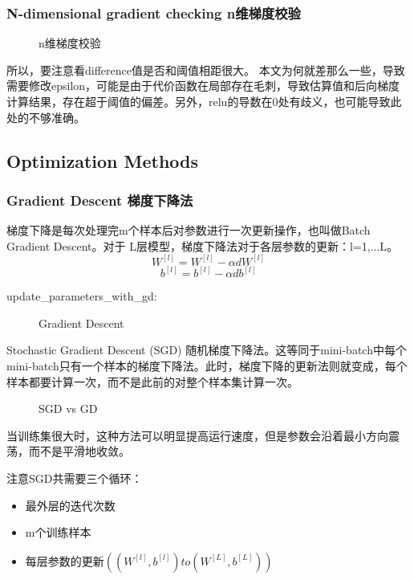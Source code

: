 \documentclass[UTF8]{ctexart}
\begin{document}
\subsubsection{N-dimensional gradient checking n维梯度校验}

\begin{figure}[htb]
 \caption{n维梯度校验}
  \label{fig:26}
 \end{figure}

所以，要注意看difference值是否和阈值相距很大。
本文为何就差那么一些，导致需要修改epsilon，可能是由于代价函数在局部存在毛刺，导致估算值和后向梯度计算结果，存在超于阈值的偏差。另外，relu的导数在0处有歧义，也可能导致此处的不够准确。

\subsection{Optimization Methods }
\subsubsection{Gradient Descent 梯度下降法}
梯度下降是每次处理完m个样本后对参数进行一次更新操作，也叫做Batch Gradient Descent。对于
L层模型，梯度下降法对于各层参数的更新：l=1,...L。
  \begin{equation*}
    W^{[l]}=W^{[l]}-\alpha dW^{[l]}
  \end{equation*}
\begin{equation*}
    b^{[l]}=b^{[l]}-\alpha db^{[l]}
\end{equation*}

update\_parameters\_with\_gd:
\begin{figure}[htb]
 \caption{Gradient Descent}
  \label{fig:27}
 \end{figure}

Stochastic Gradient Descent (SGD) 随机梯度下降法。这等同于mini-batch中每个mini-batch只有一个样本的梯度下降法。此时，梯度下降的更新法则就变成，每个样本都要计算一次，而不是此前的对整个样本集计算一次。
\begin{figure}[htb]
 \caption{SGD vs GD}
  \label{fig:28}
 \end{figure}

当训练集很大时，这种方法可以明显提高运行速度，但是参数会沿着最小方向震荡，而不是平滑地收敛。

注意SGD共需要三个循环：
\begin{itemize}
  \item 最外层的迭代次数
  \item m个训练样本
  \item 每层参数的更新$((W^{[l]},b^{[l]})to(W^{[L]},b^{[L]}))$
\end{itemize}
\end{document}
